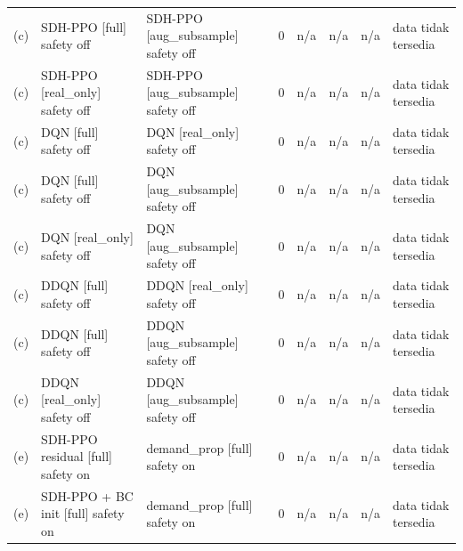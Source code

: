 \begin{table}[t]
\begin{tabular}{llllrrrl}
(c) & SDH-PPO [full] safety off & SDH-PPO [aug\_subsample] safety off & 0 & n/a & n/a & n/a & data tidak tersedia \\
(c) & SDH-PPO [real\_only] safety off & SDH-PPO [aug\_subsample] safety off & 0 & n/a & n/a & n/a & data tidak tersedia \\
(c) & DQN [full] safety off & DQN [real\_only] safety off & 0 & n/a & n/a & n/a & data tidak tersedia \\
(c) & DQN [full] safety off & DQN [aug\_subsample] safety off & 0 & n/a & n/a & n/a & data tidak tersedia \\
(c) & DQN [real\_only] safety off & DQN [aug\_subsample] safety off & 0 & n/a & n/a & n/a & data tidak tersedia \\
(c) & DDQN [full] safety off & DDQN [real\_only] safety off & 0 & n/a & n/a & n/a & data tidak tersedia \\
(c) & DDQN [full] safety off & DDQN [aug\_subsample] safety off & 0 & n/a & n/a & n/a & data tidak tersedia \\
(c) & DDQN [real\_only] safety off & DDQN [aug\_subsample] safety off & 0 & n/a & n/a & n/a & data tidak tersedia \\
(e) & SDH-PPO residual [full] safety on & demand\_prop [full] safety on & 0 & n/a & n/a & n/a & data tidak tersedia \\
(e) & SDH-PPO + BC init [full] safety on & demand\_prop [full] safety on & 0 & n/a & n/a & n/a & data tidak tersedia \\
\bottomrule
\end{tabular}
\end{table}